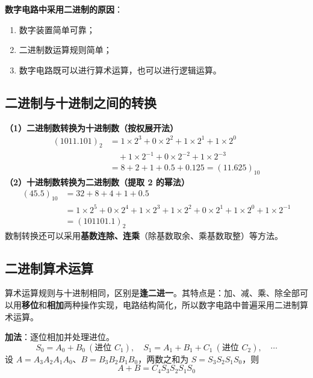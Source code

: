 \textbf{数字电路中采用二进制的原因}：
\begin{enumerate}
	\item 数字装置简单可靠；
	\item 二进制数运算规则简单；
	\item 数字电路既可以进行算术运算，也可以进行逻辑运算。
\end{enumerate}

\subsection{二进制与十进制之间的转换}
\label{sec:二进制与十进制之间的转换}

\textbf{（1）二进制数转换为十进制数（按权展开法）}
\begin{equation}
	\begin{aligned}
		(1011.101)_{2} &= 1\times2^{3}+0\times2^{2}+1\times2^{1}+1\times2^{0} \\
		&\quad +1\times2^{-1}+0\times2^{-2}+1\times2^{-3} \\
		&= 8+2+1+0.5+0.125=(11.625)_{10}
	\end{aligned}
	\label{eq:数制:二十转换}
\end{equation}
\textbf{（2）十进制数转换为二进制数（提取 2 的幂法）}
\begin{equation}
	\begin{aligned}
		(45.5)_{10} &= 32+8+4+1+0.5 \\
		&= 1\times2^{5}+0\times2^{4}+1\times2^{3}+1\times2^{2}+0\times2^{1}+1\times2^{0}+1\times2^{-1} \\
		&= (101101.1)_{2}
	\end{aligned}
	\label{eq:数制:十二转换}
\end{equation}
数制转换还可以采用\textbf{基数连除、连乘}（除基数取余、乘基数取整）等方法。

\subsection{二进制算术运算}
\label{sec:二进制算术运算}

算术运算规则与十进制相同，区别是\textbf{逢二进一}。其特点是：加、减、乘、除全部可以用\textbf{移位}和\textbf{相加}两种操作实现，电路结构简化，所以数字电路中普遍采用二进制算术运算。

\textbf{加法}：逐位相加并处理进位。
\begin{equation}
	S_0=A_0+B_0\ (\text{进位 }C_1),\quad
	S_1=A_1+B_1+C_1\ (\text{进位 }C_2),\quad \cdots
	\label{eq:数制:逐位加法}
\end{equation}
设 $A=A_3A_2A_1A_0$、$B=B_3B_2B_1B_0$，两数之和为 $S=S_3S_2S_1S_0$，则
\begin{equation}
	A+B=C_4S_3S_2S_1S_0
	\label{eq:数制:加法结果}
\end{equation}


